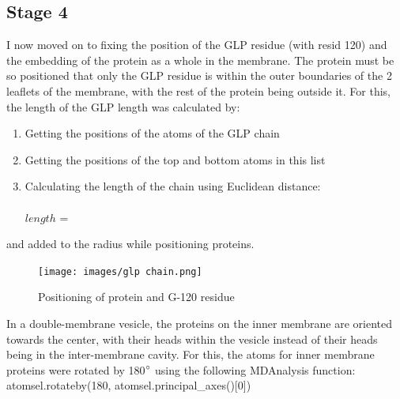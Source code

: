 \documentclass[12pt, a4paper]{report}
\begin{document}
\clearpage
\subsection*{Stage 4} 

I now moved on to fixing the position of the GLP residue (with resid 120) and the embedding of the protein as a whole in the membrane. The protein must be so positioned that only the GLP residue is within the outer boundaries of the 2 leaflets of the membrane, with the rest of the protein being outside it. For this, the length of the GLP length was calculated by: 

\begin{enumerate}
    \item Getting the positions of the atoms of the GLP chain 
    \item Getting the positions of the top and bottom atoms in this list 
    \item Calculating the length of the chain using Euclidean distance: 
    \\~\\
    \(length\) = 
\end{enumerate} 
and added to the radius while positioning proteins. 

\begin{figure}[h]
    \texttt{[image: images/glp chain.png]} 
    \centering 
    \caption{Positioning of protein and G-120 residue}
    \centering
\end{figure} 

In a double-membrane vesicle, the proteins on the inner membrane are oriented towards the center, with their heads within the vesicle instead of their heads being in the inter-membrane cavity. For this, the atoms for inner membrane proteins were rotated by 180$\degree$ using the following MDAnalysis function: 
\\ 
atomsel.rotateby(180, atomsel.principal\_axes()[0]) 
\end{document}
